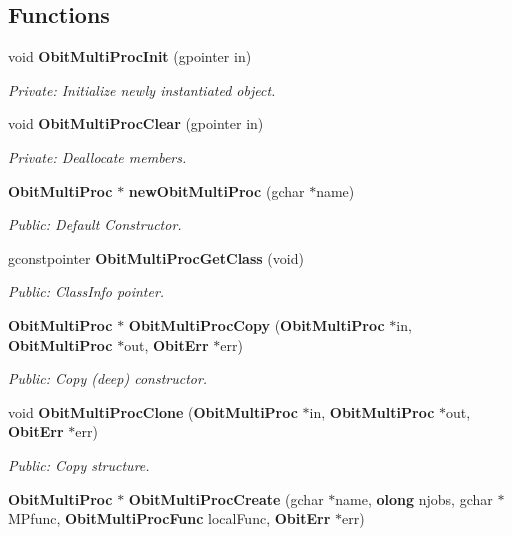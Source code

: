 \subsection*{Functions}
\begin{CompactItemize}
\item 
void {\bf Obit\-Multi\-Proc\-Init} (gpointer in)
\begin{CompactList}\small\item\em Private: Initialize newly instantiated object. \item\end{CompactList}\item 
void {\bf Obit\-Multi\-Proc\-Clear} (gpointer in)
\begin{CompactList}\small\item\em Private: Deallocate members. \item\end{CompactList}\item 
{\bf Obit\-Multi\-Proc} $\ast$ {\bf new\-Obit\-Multi\-Proc} (gchar $\ast$name)
\begin{CompactList}\small\item\em Public: Default Constructor. \item\end{CompactList}\item 
gconstpointer {\bf Obit\-Multi\-Proc\-Get\-Class} (void)
\begin{CompactList}\small\item\em Public: Class\-Info pointer. \item\end{CompactList}\item 
{\bf Obit\-Multi\-Proc} $\ast$ {\bf Obit\-Multi\-Proc\-Copy} ({\bf Obit\-Multi\-Proc} $\ast$in, {\bf Obit\-Multi\-Proc} $\ast$out, {\bf Obit\-Err} $\ast$err)
\begin{CompactList}\small\item\em Public: Copy (deep) constructor. \item\end{CompactList}\item 
void {\bf Obit\-Multi\-Proc\-Clone} ({\bf Obit\-Multi\-Proc} $\ast$in, {\bf Obit\-Multi\-Proc} $\ast$out, {\bf Obit\-Err} $\ast$err)
\begin{CompactList}\small\item\em Public: Copy structure. \item\end{CompactList}\item 
{\bf Obit\-Multi\-Proc} $\ast$ {\bf Obit\-Multi\-Proc\-Create} (gchar $\ast$name, {\bf olong} njobs, gchar $\ast$MPfunc, {\bf Obit\-Multi\-Proc\-Func} local\-Func, {\bf Obit\-Err} $\ast$err)

\end{CompactItemize}
